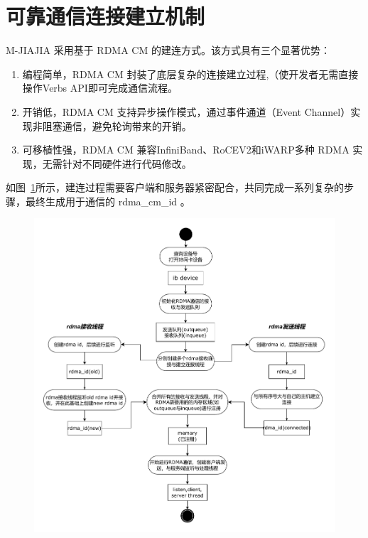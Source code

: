 {\section{可靠通信连接建立机制}
M-JIAJIA 采用基于 RDMA CM 的建连方式。该方式具有三个显著优势：
\begin{enumerate}[label=\arabic*.]
    \item 编程简单，RDMA CM 封装了底层复杂的连接建立过程,（使开发者无需直接操作Verbs API即可完成通信流程。
    \item 开销低，RDMA CM 支持异步操作模式，通过事件通道（Event Channel）实现非阻塞通信，避免轮询带来的开销。
    \item 可移植性强，RDMA CM 兼容InfiniBand、RoCEV2和iWARP多种 RDMA 实现，无需针对不同硬件进行代码修改。
\end{enumerate}

如图~\ref{fig:mjiajia-cm-connection}所示，建连过程需要客户端和服务器紧密配合，共同完成一系列复杂的步骤，最终生成用于通信的 rdma\_cm\_id 。

\begin{figure}[H]
    \centering
    \includegraphics[width=\textwidth]{Img/rdma_init.drawio.pdf}
    \label{fig:mjiajia-cm-connection}
\end{figure}

}
